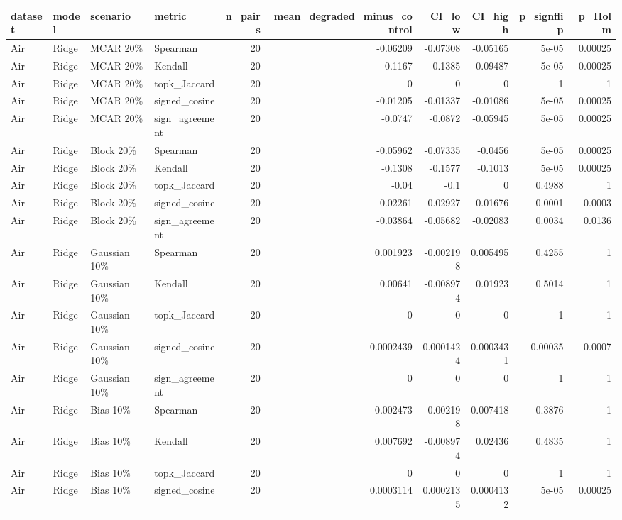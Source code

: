 \begin{tabular}{llllrrrrrr}
\toprule
dataset & model & scenario & metric & n\_pairs & mean\_degraded\_minus\_control & CI\_low & CI\_high & p\_signflip & p\_Holm \\
\midrule
Air & Ridge & MCAR 20\% & Spearman & 20 & -0.06209 & -0.07308 & -0.05165 & 5e-05 & 0.00025 \\
Air & Ridge & MCAR 20\% & Kendall & 20 & -0.1167 & -0.1385 & -0.09487 & 5e-05 & 0.00025 \\
Air & Ridge & MCAR 20\% & topk\_Jaccard & 20 & 0 & 0 & 0 & 1 & 1 \\
Air & Ridge & MCAR 20\% & signed\_cosine & 20 & -0.01205 & -0.01337 & -0.01086 & 5e-05 & 0.00025 \\
Air & Ridge & MCAR 20\% & sign\_agreement & 20 & -0.0747 & -0.0872 & -0.05945 & 5e-05 & 0.00025 \\
Air & Ridge & Block 20\% & Spearman & 20 & -0.05962 & -0.07335 & -0.0456 & 5e-05 & 0.00025 \\
Air & Ridge & Block 20\% & Kendall & 20 & -0.1308 & -0.1577 & -0.1013 & 5e-05 & 0.00025 \\
Air & Ridge & Block 20\% & topk\_Jaccard & 20 & -0.04 & -0.1 & 0 & 0.4988 & 1 \\
Air & Ridge & Block 20\% & signed\_cosine & 20 & -0.02261 & -0.02927 & -0.01676 & 0.0001 & 0.0003 \\
Air & Ridge & Block 20\% & sign\_agreement & 20 & -0.03864 & -0.05682 & -0.02083 & 0.0034 & 0.0136 \\
Air & Ridge & Gaussian 10\% & Spearman & 20 & 0.001923 & -0.002198 & 0.005495 & 0.4255 & 1 \\
Air & Ridge & Gaussian 10\% & Kendall & 20 & 0.00641 & -0.008974 & 0.01923 & 0.5014 & 1 \\
Air & Ridge & Gaussian 10\% & topk\_Jaccard & 20 & 0 & 0 & 0 & 1 & 1 \\
Air & Ridge & Gaussian 10\% & signed\_cosine & 20 & 0.0002439 & 0.0001424 & 0.0003431 & 0.00035 & 0.0007 \\
Air & Ridge & Gaussian 10\% & sign\_agreement & 20 & 0 & 0 & 0 & 1 & 1 \\
Air & Ridge & Bias 10\% & Spearman & 20 & 0.002473 & -0.002198 & 0.007418 & 0.3876 & 1 \\
Air & Ridge & Bias 10\% & Kendall & 20 & 0.007692 & -0.008974 & 0.02436 & 0.4835 & 1 \\
Air & Ridge & Bias 10\% & topk\_Jaccard & 20 & 0 & 0 & 0 & 1 & 1 \\
Air & Ridge & Bias 10\% & signed\_cosine & 20 & 0.0003114 & 0.0002135 & 0.0004132 & 5e-05 & 0.00025 \\

\end{tabular}
